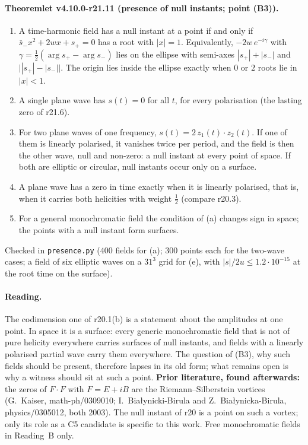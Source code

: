 \paragraph{Theoremlet v4.10.0-r21.11 (presence of null instants; point (B3)).}
\begin{enumerate}[leftmargin=2em]
\item[(a)] A time-harmonic field has a null instant at a point if and only if \(\bar s_-x^2+2wx+s_+=0\) has a root with \(|x|=1\).
Equivalently, \(-2w\,e^{-i\gamma}\) with \(\gamma=\tfrac12(\arg s_+-\arg s_-)\) lies on the ellipse with semi-axes \(|s_+|+|s_-|\) and
\(\bigl||s_+|-|s_-|\bigr|\).  The origin lies inside the ellipse exactly when \(0\) or \(2\) roots lie in \(|x|<1\).
\item[(b)] A single plane wave has \(s(t)=0\) for all \(t\), for every polarisation (the lasting zero of r21.6).
\item[(c)] For two plane waves of one frequency, \(s(t)=2\,z_1(t)\cdot z_2(t)\).  If one of them is linearly polarised, it vanishes twice per
period, and the field is then the other wave, null and non-zero: a null instant at every point of space.  If both are elliptic or
circular, null instants occur only on a surface.
\item[(d)] A plane wave has a zero in time exactly when it is linearly polarised, that is, when it carries both helicities with weight
\(\tfrac12\) (compare r20.3).
\item[(e)] For a general monochromatic field the condition of (a) changes sign in space; the points with a null instant form surfaces.
\end{enumerate}
Checked in \texttt{presence.py} (\(400\) fields for (a); \(300\) points each for the two-wave cases; a field of six elliptic waves on a
\(31^3\) grid for (e), with \(|s|/2u\le1.2\cdot10^{-15}\) at the root time on the surface).

\paragraph{Reading.}
The codimension one of r20.1(b) is a statement about the amplitudes at one point.  In space it is a surface: every generic
monochromatic field that is not of pure helicity everywhere carries surfaces of null instants, and fields with a linearly polarised
partial wave carry them everywhere.  The question of (B3), why such fields should be present, therefore lapses in its old form; what
remains open is why a witness should sit at such a point.  \textbf{Prior literature, found afterwards:} the zeros of \(F\cdot F\) with
\(F=E+iB\) are the Riemann--Silberstein vortices (G.~Kaiser, math-ph/0309010; I.~Bia\l{}ynicki-Birula and Z.~Bia\l{}ynicka-Birula,
physics/0305012, both 2003).  The null instant of r20 is a point on such a vortex; only its role as a C5 candidate is specific to this
work.  Free monochromatic fields in Reading~B only.

